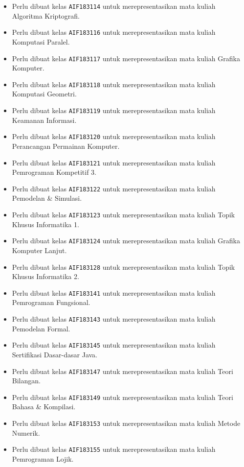 \begin{enumerate}
\begin{itemize}
		\item Perlu dibuat kelas \texttt{AIF183114} untuk merepresentasikan mata kuliah Algoritma Kriptografi.
		\item Perlu dibuat kelas \texttt{AIF183116} untuk merepresentasikan mata kuliah Komputasi Paralel.
		\item Perlu dibuat kelas \texttt{AIF183117} untuk merepresentasikan mata kuliah Grafika Komputer.
		\item Perlu dibuat kelas \texttt{AIF183118} untuk merepresentasikan mata kuliah Komputasi Geometri.
		\item Perlu dibuat kelas \texttt{AIF183119} untuk merepresentasikan mata kuliah Keamanan Informasi.
		\item Perlu dibuat kelas \texttt{AIF183120} untuk merepresentasikan mata kuliah Perancangan Permainan Komputer.
		\item Perlu dibuat kelas \texttt{AIF183121} untuk merepresentasikan mata kuliah Pemrograman Kompetitif 3.
		\item Perlu dibuat kelas \texttt{AIF183122} untuk merepresentasikan mata kuliah Pemodelan \& Simulasi.
		\item Perlu dibuat kelas \texttt{AIF183123} untuk merepresentasikan mata kuliah Topik Khusus Informatika 1.
		\item Perlu dibuat kelas \texttt{AIF183124} untuk merepresentasikan mata kuliah Grafika Komputer Lanjut.
		\item Perlu dibuat kelas \texttt{AIF183128} untuk merepresentasikan mata kuliah Topik Khusus Informatika 2.
		\item Perlu dibuat kelas \texttt{AIF183141} untuk merepresentasikan mata kuliah Pemrograman Fungsional.
		\item Perlu dibuat kelas \texttt{AIF183143} untuk merepresentasikan mata kuliah Pemodelan Formal.
		\item Perlu dibuat kelas \texttt{AIF183145} untuk merepresentasikan mata kuliah Sertifikasi Dasar-dasar Java.
		\item Perlu dibuat kelas \texttt{AIF183147} untuk merepresentasikan mata kuliah Teori Bilangan.
		\item Perlu dibuat kelas \texttt{AIF183149} untuk merepresentasikan mata kuliah Teori Bahasa \& Kompilasi.
		\item Perlu dibuat kelas \texttt{AIF183153} untuk merepresentasikan mata kuliah Metode Numerik.
		\item Perlu dibuat kelas \texttt{AIF183155} untuk merepresentasikan mata kuliah Pemrograman Lojik.

\end{itemize}
\end{enumerate}
